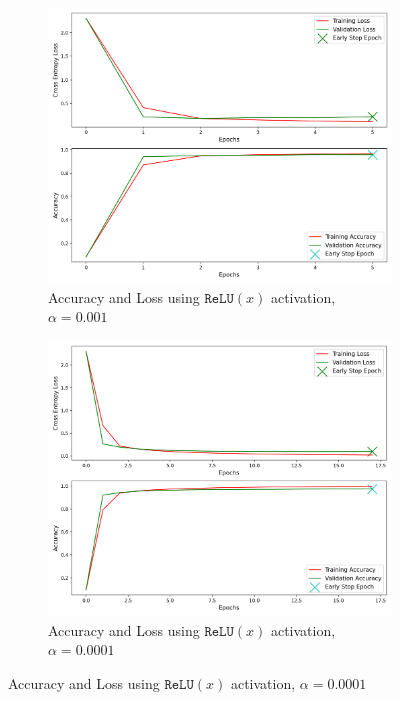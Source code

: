 \begin{figure}[H]
	\begin{subfigure}{0.5\textwidth}
		\centering
		\includegraphics[width=1.0\textwidth]{./images/activation_relu.png}
		\caption{Accuracy and Loss using $\texttt{ReLU}(x)$ activation, $\alpha = 0.001$}
		\label{fig:relu}
	\end{subfigure}
	\begin{subfigure}{0.5\textwidth}
		\centering
		\includegraphics[width=1.0\textwidth]{./images/activation_relu2.png}
		\caption{Accuracy and Loss using $\texttt{ReLU}(x)$ activation, $\alpha = 0.0001$}
		\label{fig:relu2}
	\end{subfigure}
\end{figure}

